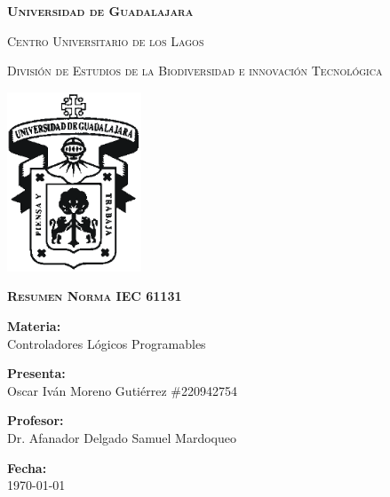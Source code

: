 \documentclass[12pt]{report}
\begin{document}
\setlength{\hoffset}{27 pt} %
\begin{titlepage}
{\centering
{\scshape\bfseries\fontsize{29.16}{34.992}\selectfont Universidad de Guadalajara \par}
\vspace{0.5cm}
{\scshape\Large Centro Universitario de los Lagos \par}
\vspace{1cm}
{\scshape\Large División de Estudios de la Biodiversidad e innovación Tecnológica \par}
\vspace{1cm}
{\graphicspath{{imagenes/Portada}} %
\includegraphics[width=0.3\textwidth]{image.png}\par}
\vspace{1cm}
{\scshape\large\bfseries Resumen Norma IEC 61131\par}
\vspace{1.5cm}
{\large \textbf{Materia:} \\Controladores Lógicos Programables\par}
\vfill
{\large \textbf{Presenta:} \\Oscar Iván Moreno Gutiérrez \#220942754\par}
\vfill
{\large \textbf{Profesor:} \\Dr. Afanador Delgado Samuel Mardoqueo \par}
\vfill
\vfill
\begin{flushright}
  {\normalsize \textbf {Fecha:} \\ \today}
\end{flushright}
\vfill}
{\large  \par}
\end{titlepage}
\end{document}
